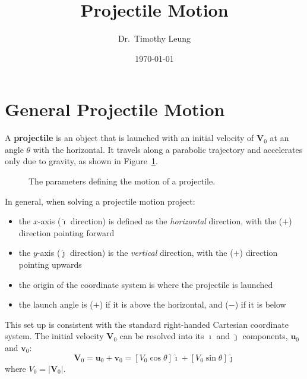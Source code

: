 \documentclass{../../oss-handout}\usepackage{amsmath,bm}
\title{Projectile Motion}
\author{Dr.\ Timothy Leung}
\date{\today}
\newcommand{\mb}[1]{\mathbf{#1}}
\newcommand{\iii}{\hat{\bm{\imath}}}
\newcommand{\jjj}{\hat{\bm{\jmath}}}
\begin{document}
\thispagestyle{title}
\gentitle

\section{General Projectile Motion}
A \textbf{projectile} is an object that is launched with an initial velocity
of $\mb V_0$ at an angle $\theta$ with the horizontal. It travels along a
parabolic trajectory and accelerates only due to gravity, as shown in
Figure~\ref{fig:projectile}. 
\begin{figure}[ht]
  \centering
  \caption{The parameters defining the motion of a projectile.}
  \label{fig:projectile}
\end{figure}

In general, when solving a projectile motion project:
\begin{itemize}[nosep]
\item the $x$-axis ($\iii$ direction) is defined as the \emph{horizontal}
  direction, with the ($+$) direction pointing forward
\item the $y$-axis ($\jjj$ direction) is the \emph{vertical} direction, with
  the ($+$) direction pointing upwards
\item the origin of the coordinate system is where the projectile is launched
\item the launch angle is ($+$) if it is above the horizontal, and ($-$) if it
  is below
\end{itemize}
This set up is consistent with the standard right-handed Cartesian coordinate
system. The initial velocity $\mb V_0$ can be resolved into its $\iii$ and
$\jjj$ components, $\mb u_0$ and $\mb v_0$:
\begin{equation}
  \mb V_0 =\mb u_0+\mb v_0
  =\left[V_0\cos\theta\right]\iii + \left[V_0\sin\theta\right]\jjj
\end{equation}
where $V_0=|\mb V_0|$.
\end{document}
